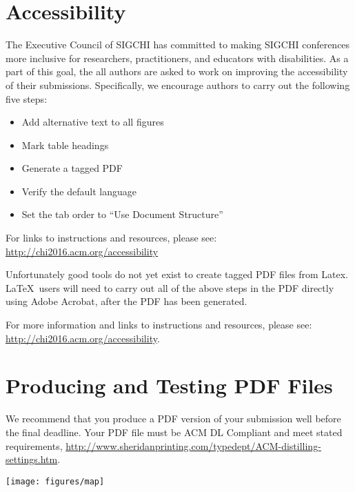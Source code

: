 \documentclass{sigchi-ext}
\begin{document}
    \section{Accessibility}
    The Executive Council of SIGCHI has committed to making SIGCHI
    conferences more inclusive for researchers, practitioners, and
    educators with disabilities. As a part of this goal, the all authors
    are asked to work on improving the accessibility of their
    submissions. Specifically, we encourage authors to carry out the
    following five steps:
    \begin{itemize}\compresslist%
    \item Add alternative text to all figures
    \item Mark table headings
    \item Generate a tagged PDF
    \item Verify the default language
    \item Set the tab order to ``Use Document Structure''
    \end{itemize}
    
    For links to instructions and resources, please see:
    \url{http://chi2016.acm.org/accessibility}
    
    Unfortunately good tools do not yet exist to create tagged PDF files
    from Latex. \LaTeX\ users will need to carry out all of the above
    steps in the PDF directly using Adobe Acrobat, after the PDF has been
    generated.
    
    For more information and links to instructions and resources, please
    see:
    \url{http://chi2016.acm.org/accessibility}.
    
    \section{Producing and Testing PDF Files}
    We recommend that you produce a PDF version of your submission well
    before the final deadline. Your PDF file must be ACM DL Compliant and
    meet stated requirements,
    \url{http://www.sheridanprinting.com/typedept/ACM-distilling-settings.htm}.
    
    \begin{figure*}
      \centering
      \texttt{[image: figures/map]}
      \caption{In this image, the map maximizes use of space. You can make
        figures as wide as you need, up to a maximum of the full width of
        both columns. Note that \LaTeX\ tends to render large figures on a
        dedicated page. Image: \ccbynd~ayman on Flickr.}~\label{fig:cats}
    \end{figure*}
    
\end{document}
